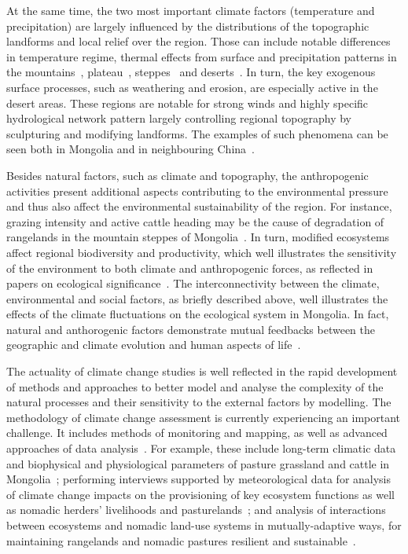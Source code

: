 \documentclass[geosciences,article,accept,pdftex,oneauthor]{Definitions/mdpi}
\begin{document}
At the same time, the two most important climate factors (temperature and precipitation) are largely influenced by the distributions of the topographic landforms and local relief over the region. Those can include notable differences in temperature regime, thermal effects from surface and precipitation patterns in the mountains~\cite{LEHMKUHL201824,LEHMKUHL201212}, plateau~\cite{LUO2021105505,Baoetal2015,CHEN2022108560}, steppes~\cite{Zemmrich} and deserts~\cite{LI2021105259,LUO201957,RAHMAN2022391,SAAVEDRA2020104711,LEI2021105661}. In turn, the key exogenous surface processes, such as weathering and erosion, are especially active in the desert areas. These regions are notable for strong winds and highly specific hydrological network pattern largely controlling regional topography by sculpturing and modifying {landforms}. The examples of such phenomena can be seen both in Mongolia and in neighbouring China~\cite{DAI2022115518,XU2020100496,LYU2021111488}. 

Besides natural factors, such as climate and topography, the anthropogenic activities present additional aspects contributing to the environmental pressure and thus also affect the environmental sustainability of the region. For instance, grazing intensity and active cattle heading may be the cause of degradation of rangelands in the mountain steppes of Mongolia~\cite{Otgontuya,Khishigdorj,ADDISON201337}. In turn, modified ecosystems affect regional biodiversity and productivity, which well illustrates the sensitivity of the environment to both climate and anthropogenic forces, as reflected in papers on ecological significance~\cite{Klauco2013,Lemenkova2021c,Bumtsend}. The interconnectivity between the climate, environmental and social factors, as briefly described above, well illustrates the effects of the climate fluctuations on the ecological system in Mongolia. In fact, natural and anthorogenic factors demonstrate mutual feedbacks between the geographic and climate evolution and human aspects of life~\cite{YU201977,XU2021104333,TUGJAMBA2021101360}.



The actuality of climate change studies is well reflected in the rapid development of methods and approaches to better model and analyse the complexity of the natural processes and their sensitivity to the external factors by modelling. The methodology of climate change assessment is currently experiencing an important challenge. It includes methods of monitoring and mapping, as well as advanced approaches of data analysis~\cite{FENG2020102861,WANG201768,GUO2021141481}. For example, these include long-term climatic data and biophysical and physiological parameters of pasture grassland and cattle in Mongolia~\cite{Bolortsetseg,SASAKI2022104690}; performing interviews supported by meteorological data for analysis of climate change impacts on the provisioning of key ecosystem functions as well as nomadic herders' livelihoods and pasturelands~\cite{Tugjamba}; and analysis of interactions between ecosystems and nomadic land-use systems in mutually-adaptive ways, for maintaining rangelands and nomadic pastures resilient and sustainable~\cite{Chuluun}. 
\end{document}
